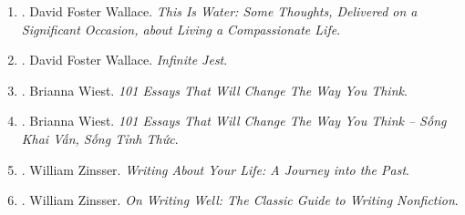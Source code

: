 \documentclass{article}
\begin{document}
\begin{enumerate}
	\item \cite{Wallace_water}. David Foster Wallace. {\it This Is Water: Some Thoughts, Delivered on a Significant Occasion, about Living a Compassionate Life}.\hfill{\sf[done]}
	
	\item \cite{Wallace_jest}. David Foster Wallace. {\it Infinite Jest}.\hfill{\sf[reading]}
	
	\item \cite{Wiest_101_essays}. {\sc Brianna Wiest}. {\it 101 Essays That Will Change The Way You Think}.
	
	\item \cite{Wiest_101_essays_VN}. {\sc Brianna Wiest}. {\it 101 Essays That Will Change The Way You Think -- Sống Khai Vấn, Sống Tỉnh Thức}.\hfill{\sf[done]}
	
	\item \cite{Zinsser2005}. William Zinsser. {\it Writing About Your Life: A Journey into the Past}.
	
	\item \cite{Zinsser2016}. William Zinsser. {\it On Writing Well: The Classic Guide to Writing Nonfiction}.\hfill{\sf[reading]}
\end{enumerate}

\end{document}
